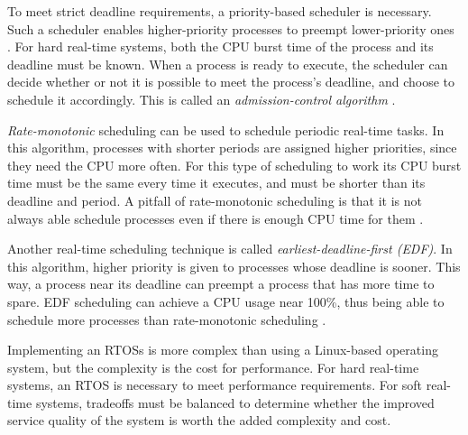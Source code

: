     To meet strict deadline requirements, a priority-based scheduler is
        necessary.
    Such a scheduler enables higher-priority processes to preempt lower-priority
        ones \cite[p. 229]{textbook}.
    For hard real-time systems, both the CPU burst time of the process and its
        deadline must be known.
    When a process is ready to execute, the scheduler can decide whether or not
        it is possible to meet the process's deadline, and choose to schedule it
        accordingly.
    This is called an \textit{admission-control algorithm}
        \cite[pp. 229-230]{textbook}.

    \textit{Rate-monotonic} scheduling can be used to schedule periodic real-time tasks.
    In this algorithm, processes with shorter periods are assigned higher
        priorities, since they need the CPU more often.
    For this type of scheduling to work its CPU burst time must be the same
        every time it executes, and must be shorter than its deadline and
        period.
    A pitfall of rate-monotonic scheduling is that it is not always able
        schedule processes even if there is enough CPU time for them
        \cite[pp. 230-232]{textbook}.

    Another real-time scheduling technique is called
        \textit{earliest-deadline-first (EDF)}.
    In this algorithm, higher priority is given to processes whose deadline is
        sooner.
    This way, a process near its deadline can preempt a process that has more
        time to spare.
    EDF scheduling can achieve a CPU usage near 100\%, thus being able to
        schedule more processes than rate-monotonic scheduling
        \cite[pp. 232-233]{textbook}.

    Implementing an RTOSs is more complex than using a Linux-based operating
        system, but the complexity is the cost for performance.
    For hard real-time systems, an RTOS is necessary to meet performance
        requirements.
    For soft real-time systems, tradeoffs must be balanced to determine whether
        the improved service quality of the system is worth the added complexity
        and cost.
